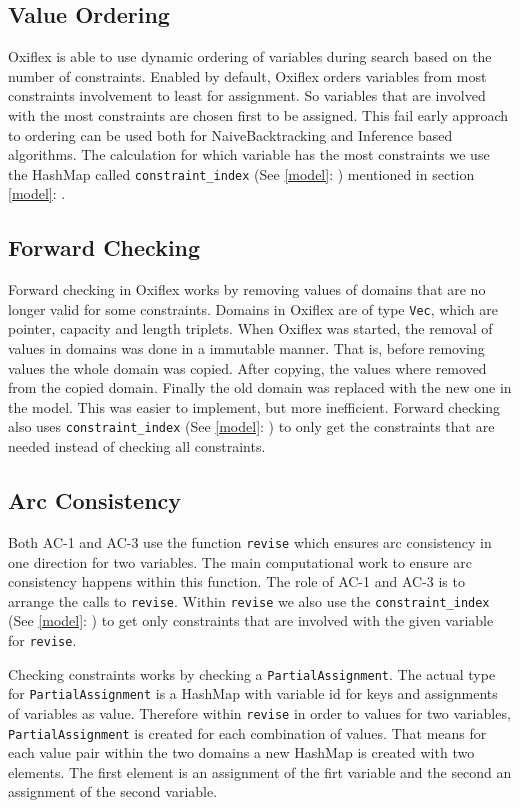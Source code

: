 \subsection{Value Ordering}

Oxiflex is able to use dynamic ordering of variables during search based on the number of constraints. Enabled by default, Oxiflex orders variables from most constraints involvement to least for assignment. So variables that are involved with the most constraints are chosen first to be assigned. This fail early approach to ordering can be used both for NaiveBacktracking and Inference based algorithms. The calculation for which variable has the most constraints we use the HashMap called \verb|constraint_index| (See \ref{model}: ) mentioned in section \ref{model}: .

\subsection{Forward Checking}

Forward checking in Oxiflex works by removing values of domains that are no longer valid for some constraints. Domains in Oxiflex are of type \verb|Vec|, which are pointer, capacity and length triplets. When Oxiflex was started, the removal of values in domains was done in a immutable manner. That is, before removing values the whole domain was copied. After copying, the values where removed from the copied domain. Finally the old domain was replaced with the new one in the model. This was easier to implement, but more inefficient. Forward checking also uses \verb|constraint_index| (See \ref{model}: ) to only get the constraints that are needed instead of checking all constraints.

\subsection{Arc Consistency}

Both AC-1 and AC-3 use the function \verb|revise| which ensures arc consistency in one direction for two variables. The main computational work to ensure arc consistency happens within this function. The role of AC-1 and AC-3 is to arrange the calls to \verb|revise|. Within \verb|revise| we also use the \verb|constraint_index| (See \ref{model}: ) to get only constraints that are involved with the given variable for \verb|revise|.

Checking constraints works by checking a \verb|PartialAssignment|. The actual type for \verb|PartialAssignment| is a HashMap with variable id for keys and assignments of variables as value. Therefore within \verb|revise| in order to values for two variables, \verb|PartialAssignment| is created for each combination of values. That means for each value pair within the two domains a new HashMap is created with two elements. The first element is an assignment of the firt variable and the second an assignment of the second variable.
